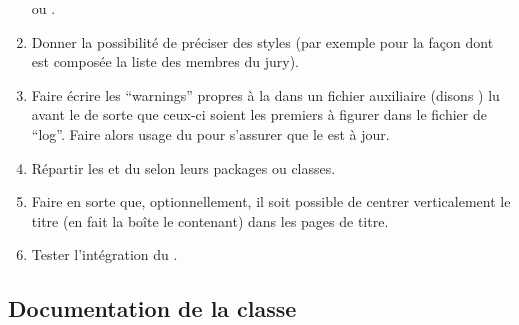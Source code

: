 \begin{enumerate}
   ou .
\item Donner la possibilité de préciser des styles (par exemple pour la façon
  dont est composée la liste des membres du jury).
\item Faire écrire les \foreignquote{english}{warnings} propres à la \yatcl{}
  dans un fichier auxiliaire (disons ) lu avant le  de sorte que ceux-ci
  soient les premiers à figurer dans le fichier de
  \foreignquote{english}{log}. Faire alors usage du 
  pour s'assurer que le  est à jour.
\item Répartir les  et  du
   selon leurs packages ou classes.
\item Faire en sorte que, optionnellement, il soit possible de centrer
  verticalement le titre (en fait la boîte le contenant) dans les pages de
  titre.
\item Tester l'intégration du .
\end{enumerate}

\subsection{Documentation de la classe}
\label{sec:documentation-de-la-ult}

